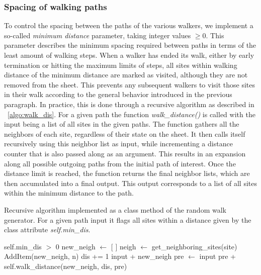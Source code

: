 \subsubsection{Spacing of walking paths} %
To control the spacing between the paths of the various walkers, we implement a so-called \textit{minimum distance} parameter, taking integer values $\ge 0$. This parameter describes the minimum spacing required between paths in terms of the least amount of walking steps. When a walker has ended its walk, either by early termination or hitting
the maximum limits of steps, all sites within walking distance of the minimum
distance are marked as visited, although they are not removed from the sheet.
This prevents any subsequent walkers to visit those sites in their walk
according to the general behavior introduced in the previous paragraph. In
practice, this is done through a recursive algorithm as described in ~\cref{algo:walk_dis}. For a given path the function \textit{walk\_distance()} is called with the input being a list of all sites in the given paths. The function gathers all the neighbors of each site, regardless of their state on the sheet. It then calls itself recursively using this neighbor list as input, while incrementing a distance counter that is also passed along as an argument. This results in an expansion along all possible outgoing paths from the initial path of interest. Once the distance limit is reached, the function returns the final neighbor lists, which are then accumulated into a final output. This output corresponds to a list of all sites within the minimum distance to the path.


\begin{algorithm}[h]
  \caption{Recursive algorithm implemented as a class method of the random walk generator. For a given path input it flags all sites within a distance given by the class attribute \textit{self.min\_dis}.}
  \label{algo:walk_dis}
  \begin{algorithmic}[1]
    \Require self.min\_dis $>$ 0 
      \State new\_neigh $\gets$ [ ] 
        \State neigh $\gets$ get\_neighboring\_sites(site) 
           
            \State AddItem(new\_neigh, n) 
          \EndIf
        \EndFor
      \EndFor
      \State dis += 1 
       
        \State \Return input + new\_neigh 
      \Else {}
        \State pre $\gets$ input
        \State \Return pre +  self.walk\_distance(new\_neigh, dis, pre)
      \EndIf
    \EndFunction
  \end{algorithmic}
\end{algorithm}


